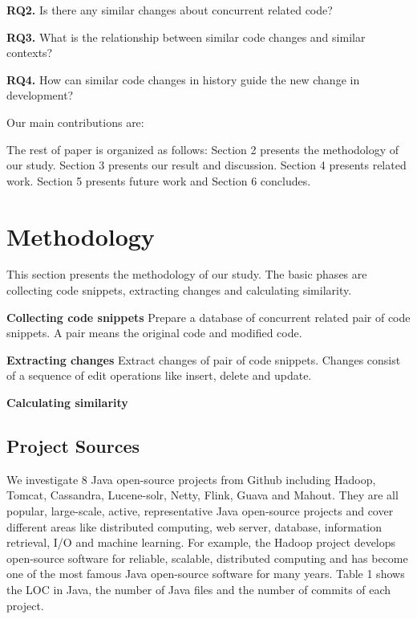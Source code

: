 \documentclass{sig-alternate-05-2015}
\begin{document}
\textbf{RQ2.} Is there any similar changes about concurrent related code?

\textbf{RQ3.} What is the relationship between similar code changes and similar contexts?

\textbf{RQ4.} How can similar code changes in history guide the new change in development?

Our main contributions are:

The rest of paper is organized as follows: Section 2 presents the methodology of our study. Section 3 presents our result and discussion. Section 4 presents related work. Section 5 presents future work and Section 6 concludes.

\section{Methodology}
This section presents the methodology of our study. The basic phases are collecting code snippets, extracting changes and calculating similarity. 

\textbf{Collecting code snippets} Prepare a database of concurrent related pair of code snippets. A pair means the original code and modified code.

\textbf{Extracting changes} Extract changes of pair of code snippets. Changes consist of a sequence of edit operations like insert, delete and update.

\textbf{Calculating similarity} 

\subsection{Project Sources} We investigate 8 Java open-source projects from Github including Hadoop, Tomcat, Cassandra, Lucene-solr, Netty, Flink, Guava and Mahout. They are all popular, large-scale, active, representative Java open-source projects and cover different areas like distributed computing, web server, database, information retrieval, I/O and machine learning. For example, the Hadoop project develops open-source software for reliable, scalable, distributed computing and has become one of the most famous Java open-source software for many years. Table 1 shows the LOC in Java, the number of Java files and the number of commits of each project.
\end{document}
